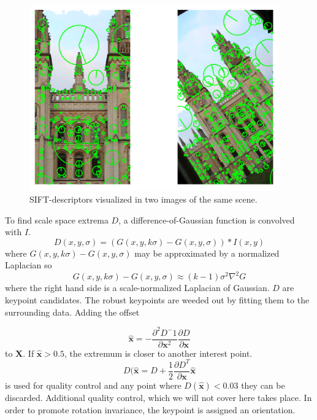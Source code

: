 \documentclass[english,12pt,a4paper,pdftex,elec,utf8, table]{aaltothesis}
\begin{document}
\begin{figure}[htb]
\begin{center}
\includegraphics[height=8cm]{figures/siftDescriptor}
\end{center}
\caption{SIFT-descriptors visualized in two images of the same scene.}
\label{siftfeatures}
\end{figure}
To find scale space extrema $D$, a difference-of-Gaussian function is convolved with $I$.
\begin{equation}\label{keypoints}
  D(x,y,\sigma) = (G(x,y,k\sigma) - G(x, y, \sigma))*I(x,y)
\end{equation}
where $G(x,y,k\sigma) - G(x, y, \sigma)$ may be approximated by a normalized Laplacian so
\begin{equation}\label{approximatedog}
G(x,y,k\sigma) - G(x, y, \sigma) \approx (k - 1)\sigma^{2}\nabla^{2}G
\end{equation}
where the right hand side is a scale-normalized Laplacian of Gaussian. $D$ are keypoint candidates. The robust keypoints are weeded out by fitting them to the surrounding data. \cite{Lowe2004} Adding the offset

\begin{equation}\label{keypointoffset}
\hat{\boldsymbol{x}} = - \frac{\partial^2D^-1}{\partial \boldsymbol{x}^2}\frac{\partial D}{\partial \boldsymbol{x}}
\end{equation}
to $\boldsymbol{X}$. If $\boldsymbol{\hat{x}} > 0.5$, the extremum is closer to another interest point.
\begin{equation}\label{rejectkeypoint}
D(\boldsymbol{\hat{x}}= D + \frac{1}{2}\frac{\partial D^T}{\partial \boldsymbol{x}}\boldsymbol{\hat{x}}
\end{equation}
is used for quality control and any point where $D(\boldsymbol{\hat{x}})<0.03$ they can be discarded. Additional quality control, which we will not cover here takes place. In order to promote rotation invariance, the keypoint is assigned an orientation.
\end{document}
